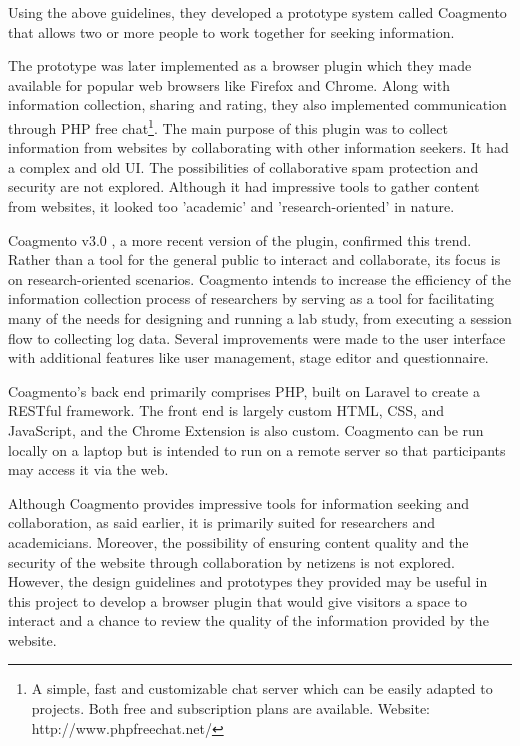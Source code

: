 Using the above guidelines, they developed a prototype system called Coagmento that allows two or more people to work together for seeking information. 

The prototype was later implemented as a browser plugin  \cite{gonzalez-ibanez_coagmento_2011} which they made available for popular web browsers like Firefox and Chrome. Along with information collection, sharing and rating, they also implemented communication through PHP free chat\footnote{A simple, fast and customizable chat server which can be easily adapted to projects. Both free and subscription plans are available. Website: http://www.phpfreechat.net/}. The main purpose of this plugin was to collect information from websites by collaborating with other information seekers. It had a complex and old UI. The possibilities of collaborative spam protection and security are not explored. Although it had impressive tools to gather content from websites, it looked too ’academic’ and ’research-oriented’ in nature.

Coagmento v3.0 \cite{soltani_coagmento_2019}, a more recent version of the plugin, confirmed this trend. Rather than a tool for the general public to interact and collaborate, its focus is on research-oriented scenarios. Coagmento intends to increase the efficiency of the information collection process of researchers by serving as a tool for facilitating many of the needs for designing and running a lab study, from executing a session flow to collecting log data\cite{soltani_coagmento_2019}. Several improvements were made to the user interface with additional features like user management, stage editor and questionnaire.

Coagmento’s back end primarily comprises PHP, built on Laravel to create a RESTful framework. The front end is largely custom HTML, CSS, and JavaScript, and the Chrome Extension is also custom. Coagmento can be run locally on a laptop but is intended to run on a remote server so that participants may access it via the web. 

Although Coagmento provides impressive tools for information seeking and collaboration, as said earlier, it is primarily suited for researchers and academicians. Moreover, the possibility of ensuring content quality and the security of the website through collaboration by netizens is not explored. However, the design guidelines and prototypes they provided may be useful in this project to develop a browser plugin that would give visitors a space to interact and a chance to review the quality of the information provided by the website.


